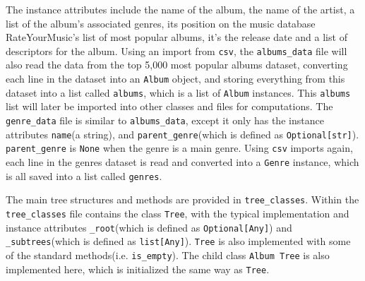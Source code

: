 \documentclass[fontsize=11pt]{article}
\begin{document}
The instance attributes include the name of the album, the name of the artist, a list of the album's associated genres, its position on the music database RateYourMusic's list of most popular albums, it's the release date and a list of descriptors for the album. Using an import from \texttt{csv}, the \texttt{albums\_data} file will also read the data from the top 5,000 most popular albums dataset, converting each line in the dataset into an \texttt{Album} object, and storing everything from this dataset into a list called \texttt{albums}, which is a list of \texttt{Album} instances. This \texttt{albums} list will later be imported into other classes and files for computations. The \texttt{genre\_data} file is similar to \texttt{albums\_data}, except it only has the instance attributes \texttt{name}(a string), and \texttt{parent\_genre}(which is defined as \texttt{Optional[str]}). \texttt{parent\_genre} is \texttt{None} when the genre is a main genre. Using \texttt{csv} imports again, each line in the genres dataset is read and converted into a \texttt{Genre} instance, which is all saved into a list called \texttt{genres}. \newline

The main tree structures and methods are provided in \texttt{tree\_classes}. Within the \texttt{tree\_classes} file contains the class \texttt{Tree}, with the typical implementation and instance attributes \texttt{\_root}(which is defined as \texttt{Optional[Any]}) and \texttt{\_subtrees}(which is defined as \texttt{list[Any]}). \texttt{Tree} is also implemented with some of the standard methods(i.e. \texttt{is\_empty}). The child class \texttt{Album Tree} is also implemented here, which is initialized the same way as \texttt{Tree}. \newline
\end{document}
